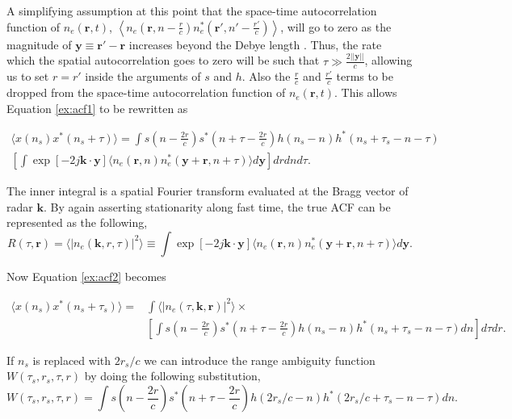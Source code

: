 \noindent A simplifying assumption at this point that the space-time autocorrelation function of $n_e(\mathbf{r},t)$, $\left\langle n_e\left(\mathbf{r},n-\frac{r}{c}\right)n^*_e\left(\mathbf{r}',n'-\frac{r'}{c}\right)\right\rangle$, will go to zero as the magnitude of $\mathbf{y} \equiv \mathbf{r}'-\mathbf{r}$ increases beyond the Debye length \cite{farley1969}. Thus, the rate which the spatial autocorrelation goes to zero will be such that $\tau\gg \frac{2||\mathbf{y}||}{c}$, allowing us to set $r= r'$ inside the arguments of $s$ and $h$. Also the $\frac{r}{c}$ and $\frac{r'}{c}$ terms to be dropped from the space-time autocorrelation function of $n_e(\mathbf{r},t)$. This allows Equation \ref{ex:acf1} to be rewritten as 
 
 \begin{multline}
 \label{ex:acf2}
 \langle x(n_s)x^*(n_s+\tau)\rangle = \int s\left(n-\frac{2r}{c}\right)s^*\left(n+\tau -\frac{2r}{c}\right) h(n_s-n)h^*(n_s+\tau_s-n-\tau) \\\left[\int \exp\left[-2j \mathbf{k}\cdot \mathbf{y}\right] \langle n_e(\mathbf{r},n)n^*_e(\mathbf{y}+\mathbf{r},n+\tau)\rangle d\mathbf{y} \right]drdn d\tau.
 \end{multline}

The inner integral is a spatial Fourier transform evaluated at the Bragg vector of radar $\mathbf{k}$. By again asserting stationarity along fast time, the true ACF can be represented as the following,
 \begin{equation}
 \label{eq:spft}
R(\tau,\mathbf{r})= \langle |n_e(\mathbf{k},r,\tau)|^2\rangle \equiv  \int \exp\left[-2j \mathbf{k}\cdot \mathbf{y} \right] \langle n_e(\mathbf{r},n)n^*_e(\mathbf{y}+\mathbf{r},n+\tau)\rangle d\mathbf{y}.
 \end{equation}
 
 \noindent Now Equation \ref{ex:acf2} becomes
 
 \begin{equation}
 \label{eqn:inbetween}
 \begin{split}
 \langle x(n_s)x^*(n_s+\tau_s)\rangle =& \int \langle |n_e(\tau,\mathbf{k},\mathbf{r})|^2\rangle \times\\ &\left[\int s(n-\frac{2r}{c})s^*(n+\tau -\frac{2r}{c})h(n_s-n)h^*(n_s+\tau_s-n-\tau) dn \right]d\tau dr.
 \end{split}
 \end{equation}

 If $n_s$ is replaced with $2r_s/c$ we can introduce the range ambiguity function $W(\tau_s,r_s,\tau,r)$ by doing the following substitution,
 \begin{equation}
 \label{eqn:rngamb}
 W(\tau_s,r_s,\tau,r)= \int s(n-\frac{2r}{c})s^*(n+\tau -\frac{2r}{c})h(2r_s/c-n)h^*(2r_s/c+\tau_s-n-\tau) dn.
 \end{equation}
 
